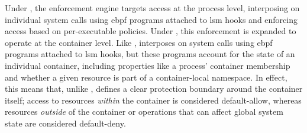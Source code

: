 Under \bpfbox{}, the enforcement engine targets access at the process level, interposing
on individual system calls using \gls{ebpf} programs attached to \gls{lsm} hooks and
enforcing access based on per-executable policies. Under \bpfcontain{}, this enforcement
is expanded to operate at the container level. Like \bpfbox{}, \bpfcontain{} interposes on
system calls using \gls{ebpf} programs attached to \gls{lsm} hooks, but these programs
account for the state of an individual container, including properties like a process'
container membership and whether a given resource is part of a container-local namespace.
In effect, this means that, unlike \bpfbox{}, \bpfcontain{} defines a clear protection
boundary around the container itself; access to resources \textit{within} the container is
considered default-allow, whereas resources \textit{outside}  of the container or
operations that can affect global system state are considered default-deny.



